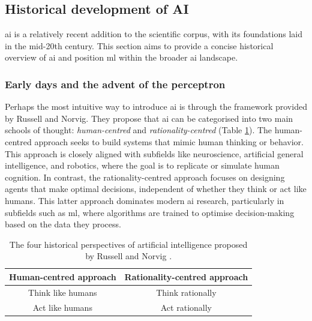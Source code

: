 \subsection{Historical development of AI}\label{subsec:ai-history}

\Acrlong{ai} is a relatively recent addition to the scientific corpus, with its foundations laid in the mid-20th century. This section aims to provide a concise historical overview of \acrshort{ai} and position \acrlong{ml} within the broader \acrshort{ai} landscape\footnotemark.


\subsubsection{Early days and the advent of the perceptron}

Perhaps the most intuitive way to introduce \acrlong{ai} is through the framework provided by Russell and Norvig. They propose that \acrlong{ai} can be categorised into two main schools of thought: \textit{human-centred} and \textit{rationality-centred} (Table \ref{tab:ai-approaches}). The human-centred approach seeks to build systems that mimic human thinking or behavior. This approach is closely aligned with subfields like neuroscience, artificial general intelligence, and robotics, where the goal is to replicate or simulate human cognition. In contrast, the rationality-centred approach focuses on designing agents that make optimal decisions, independent of whether they think or act like humans. This latter approach dominates modern \acrshort{ai} research, particularly in subfields such as \acrlong{ml}, where algorithms are trained to optimise decision-making based on the data they process. 

\begin{table}[htbp]
\centering
\caption{The four historical perspectives of artificial intelligence proposed by Russell and Norvig \cite{russell_artificial_2021}.}
\label{tab:ai-approaches}
\begin{tabular}{cc}
\toprule
\textbf{Human-centred approach} & \textbf{Rationality-centred approach} \\ \midrule
Think like humans & Think rationally \\
Act like humans & Act rationally \\ \bottomrule
\end{tabular}
\end{table}


